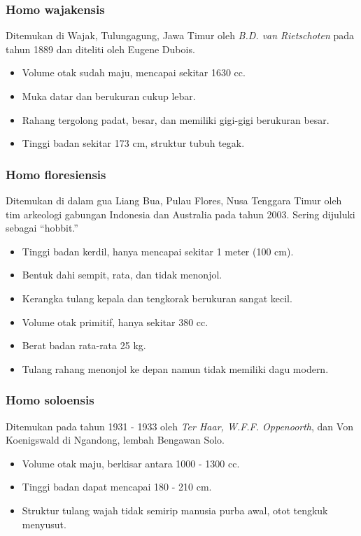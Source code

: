 \documentclass[12pt, a4paper]{article}
\begin{document}
\subsubsection{Homo wajakensis}
Ditemukan di Wajak, Tulungagung, Jawa Timur oleh \textit{B.D. van Rietschoten} pada tahun 1889 dan diteliti oleh Eugene Dubois.
\begin{itemize}
	\item Volume otak sudah maju, mencapai sekitar 1630 cc.
	\item Muka datar dan berukuran cukup lebar.
	\item Rahang tergolong padat, besar, dan memiliki gigi-gigi berukuran besar.
	\item Tinggi badan sekitar 173 cm, struktur tubuh tegak.
\end{itemize}
\subsubsection{Homo floresiensis}
Ditemukan di dalam gua Liang Bua, Pulau Flores, Nusa Tenggara Timur oleh tim arkeologi gabungan Indonesia dan Australia pada tahun 2003. Sering dijuluki sebagai ``hobbit.''
\begin{itemize}
	\item Tinggi badan kerdil, hanya mencapai sekitar 1 meter (100 cm).
	\item Bentuk dahi sempit, rata, dan tidak menonjol.
	\item Kerangka tulang kepala dan tengkorak berukuran sangat kecil.
	\item Volume otak primitif, hanya sekitar 380 cc.
	\item Berat badan rata-rata 25 kg.
	\item Tulang rahang menonjol ke depan namun tidak memiliki dagu modern.
\end{itemize}
\subsubsection{Homo soloensis}
Ditemukan pada tahun 1931 - 1933 oleh \textit{Ter Haar, W.F.F. Oppenoorth}, dan Von Koenigswald di Ngandong, lembah Bengawan Solo.
\begin{itemize}
	\item Volume otak maju, berkisar antara 1000 - 1300 cc.
	\item Tinggi badan dapat mencapai 180 - 210 cm.
	\item Struktur tulang wajah tidak semirip manusia purba awal, otot tengkuk menyusut.
\end{itemize}
\end{document}
